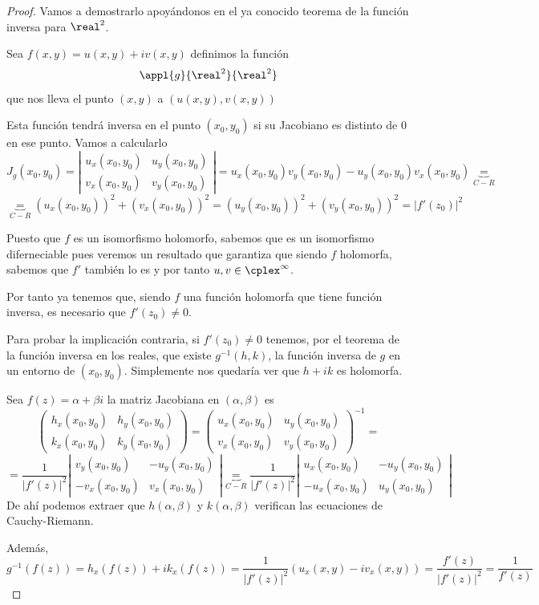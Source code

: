 \documentclass{apuntes}
\begin{document}
\begin{proof}
Vamos a demostrarlo apoyándonos en el ya conocido teorema de la función inversa para $\real^2$.

Sea $f(x,y)=u(x,y)+iv(x,y)$ definimos la función
\[\appl{g}{\real^2}{\real^2}\]
que nos lleva el punto $(x,y)$ a $\left( u(x,y), v(x,y)\right)$

Esta función tendrá inversa en el punto $(x_0,y_0)$ si su Jacobiano es distinto de 0 en ese punto. Vamos a calcularlo
\[ J_g(x_0,y_0) = \left| \begin{array}{cc}
u_x(x_0,y_0) & u_y(x_0,y_0)\\
v_x(x_0,y_0) & v_y(x_0,y_0) \end{array} \right| = u_x(x_0,y_0)v_y(x_0,y_0)-u_y(x_0,y_0)v_x(x_0,y_0) \underbrace{=}_{C-R}\]
\[\underbrace{=}_{C-R} \left(u_x(x_0,y_0)\right)^2 +\left(v_x(x_0,y_0)\right)^2 = \left(u_y(x_0,y_0)\right)^2 +\left(v_y(x_0,y_0)\right)^2 = |f'(z_0)|^2\]

Puesto que $f$ es un isomorfismo holomorfo, sabemos que es un isomorfismo diferneciable pues veremos un resultado que garantiza que siendo $f$ holomorfa, sabemos que $f'$ también lo es y por tanto $u,v \in \cplex^{\infty}$.

Por tanto ya tenemos que, siendo $f$ una función holomorfa que tiene función inversa, es necesario que $f'(z_0)\neq 0$.

Para probar la implicación contraria, si $f'(z_0) \neq 0$ tenemos, por el teorema de la función inversa en los reales, que existe $g^{-1}(h,k)$, la función inversa de $g$ en un entorno de $(x_0,y_0)$. Simplemente nos quedaría ver que $h+ik$ es holomorfa.

Sea $f(z)=α+βi$ la matriz Jacobiana en $(α,β)$ es
\[\left( \begin{array}{cc}
h_x(x_0,y_0) & h_y(x_0,y_0)\\
k_x(x_0,y_0) & k_y(x_0,y_0) \end{array} \right) = \left( \begin{array}{cc}
u_x(x_0,y_0) & u_y(x_0,y_0)\\
v_x(x_0,y_0) & v_y(x_0,y_0) \end{array} \right)^{-1}=\]
\[=\frac{1}{|f'(z)|^2}\left| \begin{array}{cc}
v_y(x_0,y_0) & -u_y(x_0,y_0)\\
-v_x(x_0,y_0) & v_x(x_0,y_0) \end{array} \right| \underbrace{=}_{C-R} \frac{1}{|f'(z)|^2}\left| \begin{array}{cc}
u_x(x_0,y_0) & -u_y(x_0,y_0)\\
-u_x(x_0,y_0) & u_y(x_0,y_0) \end{array} \right| \]
De ahí podemos extraer que $h(α,β)$ y $k(α,β)$ verifican las ecuaciones de Cauchy-Riemann.

Además,
\[g^{-1}(f(z))=h_x(f(z))+ik_x(f(z)) = \frac{1}{|f'(z)|^2}\left( u_x(x,y)-iv_x(x,y)\right) = \frac{f'(z)}{|f'(z)|^2} = \frac{1}{f'(z)}\]

\end{proof}
\end{document}
